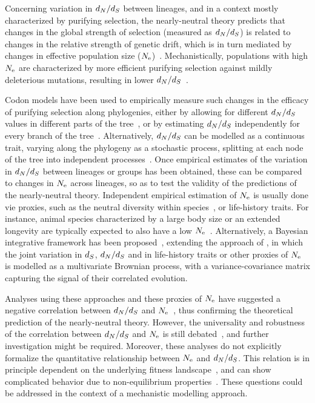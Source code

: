 \documentclass{article}
\begin{document}
Concerning variation in $d_N / d_S$ between lineages, and in a context mostly characterized by purifying selection, the {nearly-neutral} theory predicts that changes in the global strength of selection (measured as $d_N / d_S$) is related to changes in the relative strength of {genetic drift}, which is in turn mediated by changes in {effective population size} ($N_{\text{e}}$)~\citep{Ohta1992}.
Mechanistically, populations with high $N_{\text{e}}$ are characterized by more efficient purifying selection against mildly deleterious mutations, resulting in lower $d_N / d_S$~\citep{Kimura1979, Welch2008}.

Codon models have been used to empirically measure such changes in the efficacy of purifying selection along phylogenies, either by allowing for different $d_N / d_S$ values in different parts of the tree~\citep{Dutheil2012}, or by estimating $d_N / d_S$ independently for every branch of the tree~\citep{Popadin2007}.
Alternatively, $d_N / d_S$ can be modelled as a continuous trait, varying along the phylogeny as a stochastic process, splitting at each node of the tree into independent processes~\citep{Seo2004}.
Once empirical estimates of the variation in $d_N / d_S$ between lineages or groups has been obtained, these can be compared to changes in $N_{\text{e}}$ across lineages, so as to test the validity of the predictions of the {nearly-neutral} theory.
Independent empirical estimation of $N_{\text{e}}$ is usually done vie proxies, such as the {neutral} diversity within species~\citep{Galtier2016}, or life-history traits.
For instance, animal species characterized by a large body size or an extended longevity are typically expected to also have a low $N_{\text{e}}$~\citep{Romiguier2014}.
Alternatively, a Bayesian integrative framework has been proposed~\citep{Lartillot2011}, extending the approach of \citet{Seo2004}, in which the joint variation in $d_S$, $d_N / d_S$ and in life-history traits or other proxies of $N_{\text{e}}$ is modelled as a multivariate Brownian process, with a variance-covariance matrix capturing the signal of their correlated evolution.

Analyses using these approaches and these proxies of $N_{\text{e}}$ have suggested a negative correlation between $d_N / d_S$ and $N_{\text{e}}$~\citep{Popadin2007, Lanfear2010, Lartillot2011, Lartillot2012, Romiguier2014, Figuet2017}, thus confirming the theoretical prediction of the {nearly-neutral} theory.
However, the universality and robustness of the correlation between $d_N / d_S$ and $N_{\text{e}}$ is still debated~\citep{Nabholz2013,Lanfear2014,Figuet2016, Bolivar2019}, and further investigation might be required.
Moreover, these analyses do not explicitly formalize the quantitative relationship between $N_{\text{e}}$ and $d_N / d_S$.
This relation is in principle dependent on the underlying fitness landscape~\citep{Welch2008, Cherry1998, Goldstein2011}, and can show complicated behavior due to non-equilibrium properties~\citep{Jones2016}.
These questions could be addressed in the context of a mechanistic modelling approach.
\end{document}
